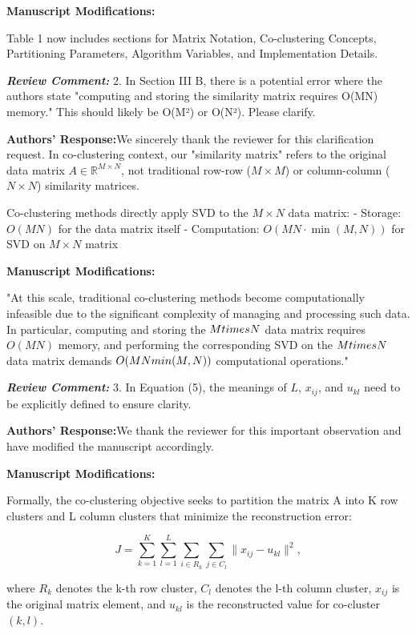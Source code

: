 \documentclass{ar2rc}
\renewcommand{\RC}[1]{\textbf{\textit{Review Comment:}} #1}
\renewcommand{\AR}{\textbf{Authors' Response:}}
\begin{document}
\textbf{Manuscript Modifications:}

Table 1 now includes sections for Matrix Notation, Co-clustering Concepts, Partitioning Parameters, Algorithm Variables, and Implementation Details.

\RC{2. In Section III B, there is a potential error where the authors state "computing and storing the similarity matrix requires O(MN) memory." This should likely be O(M²) or O(N²). Please clarify.}

\AR We sincerely thank the reviewer for this clarification request. In co-clustering context, our "similarity matrix" refers to the original data matrix $A \in \mathbb{R}^{M \times N}$, not traditional row-row ($M \times M$) or column-column ($N \times N$) similarity matrices.

Co-clustering methods directly apply SVD to the $M \times N$ data matrix:
- Storage: $O(MN)$ for the data matrix itself
- Computation: $O(MN \cdot \min(M,N))$ for SVD on $M \times N$ matrix

\textbf{Manuscript Modifications:}

"At this scale, traditional co-clustering methods become computationally infeasible due to the significant complexity of managing and processing such data. In particular, computing and storing the $M \\times N$ data matrix requires $O(MN)$ memory, and performing the corresponding SVD on the $M \\times N$ data matrix demands $O(MN\\min(M,N))$ computational operations."

\RC{3. In Equation (5), the meanings of $L$, $x_{ij}$, and $u_{kl}$ need to be explicitly defined to ensure clarity.}

\AR We thank the reviewer for this important observation and have modified the manuscript accordingly.

\textbf{Manuscript Modifications:}

Formally, the co-clustering objective seeks to partition the matrix A into K row clusters and L column clusters that minimize the reconstruction error:

\begin{equation}
  J = \sum_{k=1}^{K} \sum_{l=1}^{L} \sum_{i \in R_k} \sum_{j \in C_l} \| x_{ij} - u_{kl} \|^2,
\end{equation}

where $R_k$ denotes the k-th row cluster, $C_l$ denotes the l-th column cluster, $x_{ij}$ is the original matrix element, and $u_{kl}$ is the reconstructed value for co-cluster $(k,l)$.
\end{document}
